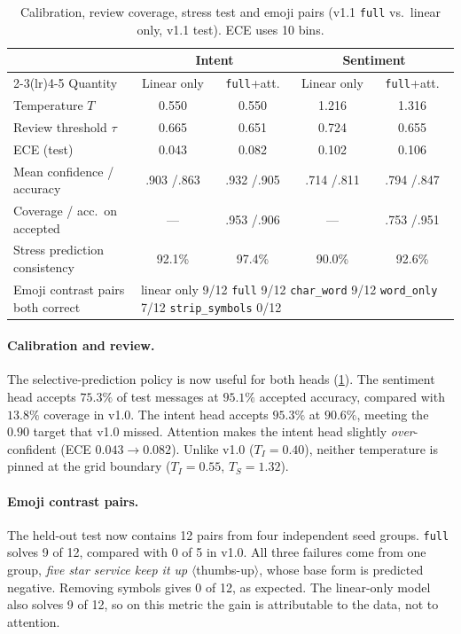 \documentclass[11pt,a4paper]{article}
\theoremstyle{remark}
\newcommand{\lbl}[1]{\texttt{#1}}                      %
\newcommand{\hi}[1]{\textit{#1}}                       %
\newcommand{\emo}[1]{\textsf{\small$\langle$#1$\rangle$}} %
\begin{document}
\begin{table}[h]
\centering\small
\caption{Calibration, review coverage, stress test and emoji pairs (v1.1 \lbl{full}
vs.\ linear only, v1.1 test). ECE uses 10 bins.}
\label{tab:v11calib}
\begin{tabular}{@{}l cc cc@{}}
\toprule
& \multicolumn{2}{c}{Intent} & \multicolumn{2}{c}{Sentiment}\\
\cmidrule(lr){2-3}\cmidrule(lr){4-5}
Quantity & Linear only & \lbl{full}+att. & Linear only & \lbl{full}+att. \\
\midrule
Temperature $T$                 & 0.550 & 0.550 & 1.216 & 1.316 \\
Review threshold $\tau$          & 0.665 & 0.651 & 0.724 & 0.655 \\
ECE (test)                      & 0.043 & 0.082 & 0.102 & 0.106 \\
Mean confidence / accuracy      &.903 /.863 &.932 /.905 &.714 /.811 &.794 /.847 \\
Coverage / acc.\ on accepted    & --- &.953 /.906 & --- &.753 /.951 \\
Stress prediction consistency   & 92.1\% & 97.4\% & 90.0\% & 92.6\% \\
\midrule
Emoji contrast pairs both correct & \multicolumn{4}{l}{\footnotesize linear only 9/12 \quad \lbl{full} 9/12 \quad \lbl{char\_word} 9/12 \quad \lbl{word\_only} 7/12 \quad \lbl{strip\_symbols} 0/12} \\
\bottomrule
\end{tabular}
\end{table}

\paragraph{Calibration and review.} The selective-prediction policy is now
useful for both heads (\cref{tab:v11calib}). The sentiment head accepts
$75.3\%$ of test messages at $95.1\%$ accepted accuracy, compared with $13.8\%$
coverage in v1.0. The intent head accepts $95.3\%$ at $90.6\%$, meeting the
$0.90$ target that v1.0 missed. Attention makes the intent head slightly
\emph{over}-confident (ECE $0.043\to0.082$). Unlike v1.0 ($T_I=0.40$), neither temperature
is pinned at the grid boundary ($T_I=0.55$, $T_S=1.32$).

\paragraph{Emoji contrast pairs.} The held-out test now contains 12 pairs from
four independent seed groups. \lbl{full} solves 9 of 12, compared with 0 of 5
in v1.0. All three failures come from one group,
\hi{five star service keep it up} \emo{thumbs-up}, whose base form is
predicted negative. Removing symbols gives 0 of 12, as expected. The linear-only
model also solves 9 of 12, so on this metric the gain is attributable to the
data, not to attention.
\end{document}
